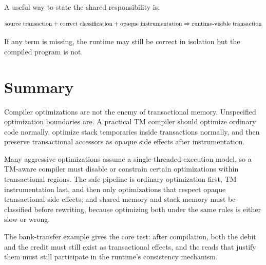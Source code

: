 A useful way to state the shared responsibility is:

\[
\small
\text{source transaction} + \text{correct classification} + \text{opaque instrumentation}
\Rightarrow \text{runtime-visible transaction}
\]

If any term is missing, the runtime may still be correct in isolation but the compiled program is not.

\section{Summary}

Compiler optimizations are not the enemy of transactional memory. Unspecified optimization boundaries are. A practical TM compiler should optimize ordinary code normally, optimize stack temporaries inside transactions normally, and then preserve transactional accessors as opaque side effects after instrumentation.

Many aggressive optimizations assume a single-threaded execution model, so a TM-aware compiler must disable or constrain certain optimizations within transactional regions. The safe pipeline is ordinary optimization first, TM instrumentation last, and then only optimizations that respect opaque transactional side effects; and shared memory and stack memory must be classified before rewriting, because optimizing both under the same rules is either slow or wrong.

The bank-transfer example gives the core test: after compilation, both the debit and the credit must still exist as transactional effects, and the reads that justify them must still participate in the runtime's consistency mechanism.

